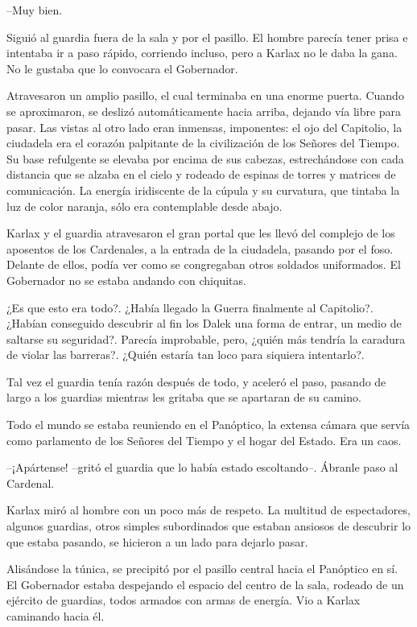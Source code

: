 --Muy bien.

Siguió al guardia fuera de la sala y por el pasillo. El hombre parecía tener prisa e intentaba ir a paso rápido, corriendo incluso, pero a Karlax no le daba la gana. No le gustaba que lo convocara el Gobernador.

Atravesaron un amplio pasillo, el cual terminaba en una enorme puerta. Cuando se aproximaron, se deslizó automáticamente hacia arriba, dejando vía libre para pasar. Las vistas al otro lado eran inmensas, imponentes: el ojo del Capitolio, la ciudadela era el corazón palpitante de la civilización de los Señores del Tiempo. Su base refulgente se elevaba por encima de sus cabezas, estrechándose con cada distancia que se alzaba en el cielo y rodeado de espinas de torres y matrices de comunicación. La energía iridiscente de la cúpula y su curvatura, que tintaba la luz de color naranja, sólo era contemplable desde abajo.  

Karlax y el guardia atravesaron el gran portal que les llevó del complejo de los aposentos de los Cardenales, a la entrada de la ciudadela, pasando por el foso. Delante de ellos, podía ver como se congregaban otros soldados uniformados. El Gobernador no se estaba andando con chiquitas. 

¿Es que esto era todo?. ¿Había llegado la Guerra finalmente al Capitolio?. ¿Habían conseguido descubrir al fin los Dalek una forma de entrar, un medio de saltarse su seguridad?. Parecía improbable, pero, ¿quién más tendría la caradura de violar las barreras?. ¿Quién estaría tan loco para siquiera intentarlo?.

Tal vez el guardia tenía razón después de todo, y aceleró el paso, pasando de largo a los guardias mientras les gritaba que se apartaran de su camino.

Todo el mundo se estaba reuniendo en el Panóptico, la extensa cámara que servía como parlamento de los Señores del Tiempo y el hogar del Estado. Era un caos.

--¡Apártense! --gritó el guardia que lo había estado escoltando--. Ábranle paso al Cardenal.

Karlax miró al hombre con un poco más de respeto. La multitud de espectadores, algunos guardias, otros simples subordinados que estaban ansiosos de descubrir lo que estaba pasando, se hicieron a un lado para dejarlo pasar.

Alisándose la túnica, se precipitó por el pasillo central hacia el Panóptico en sí. El Gobernador estaba despejando el espacio del centro de la sala, rodeado de un ejército de guardias, todos armados con armas de energía. Vio a Karlax caminando hacia él.

